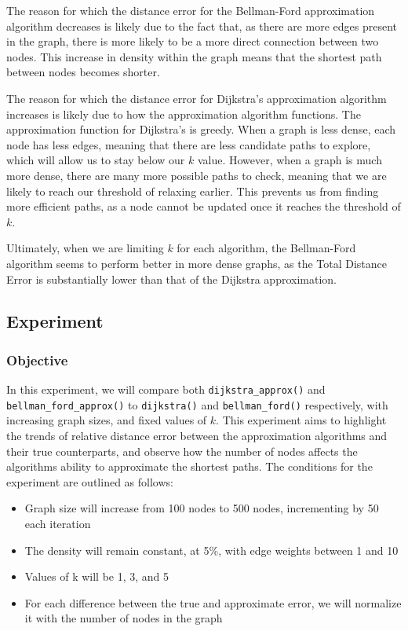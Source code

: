 \documentclass[letterpaper]{article}
\theoremstyle{plain}
\theoremstyle{definition}
\theoremstyle{remark}
\newcounter{experiment}
\begin{document}
The reason for which the distance error for the Bellman-Ford approximation algorithm decreases is likely due to the fact that, as there are more edges present in the graph, there is more likely to be a more direct connection between two nodes. This increase in density within the graph means that the shortest path between nodes becomes shorter.

The reason for which the distance error for Dijkstra's approximation algorithm increases is likely due to how the approximation algorithm functions. The approximation function for Dijkstra's is greedy. When a graph is less dense, each node has less edges, meaning that there are less candidate paths to explore, which will allow us to stay below our $k$ value. However, when a graph is much more dense, there are many more possible paths to check, meaning that we are likely to reach our threshold of relaxing earlier. This prevents us from finding more efficient paths, as a node cannot be updated once it reaches the threshold of $k$. 

Ultimately, when we are limiting $k$ for each algorithm, the Bellman-Ford algorithm seems to perform better in more dense graphs, as the Total Distance Error is substantially lower than that of the Dijkstra approximation.

\newpage

\subsection*{Experiment \theexperiment}
\label{exp\theexperiment}

\subsubsection*{Objective}
In this experiment, we will compare both \texttt{dijkstra\_approx()} and \texttt{bellman\_ford\_approx()} to \texttt{dijkstra()} and \texttt{bellman\_ford()} respectively, with increasing graph sizes, and fixed values of $k$. This experiment aims to highlight the trends of relative distance error between the approximation algorithms and their true counterparts, and observe how the number of nodes affects the algorithms ability to approximate the shortest paths. The conditions for the experiment are outlined as follows:
\begin{itemize}
    \item Graph size will increase from 100 nodes to 500 nodes, incrementing by 50 each iteration
    \item The density will remain constant, at 5\%, with edge weights between 1 and 10
    \item Values of k will be 1, 3, and 5
    \item For each difference between the true and approximate error, we will normalize it with the number of nodes in the graph
\end{itemize} 
\end{document}
